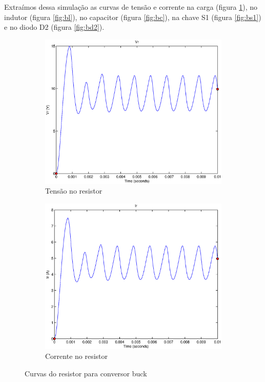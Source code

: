 \documentclass{article}
\begin{document}
Extraímos dessa simulação as curvas de tensão e corrente na carga (figura \ref{fig:br}), no indutor (figura \ref{fig:bl}), no capacitor (figura \ref{fig:bc}), na chave S1 (figura \ref{fig:bs1}) e no diodo D2 (figura \ref{fig:bd2}).
\begin{figure}[H]
	\centering
	\begin{subfigure}[b]{0.4\linewidth}
		\includegraphics[width=\linewidth]{matlab/buck/b_vr}
		\caption{Tensão no resistor}
	\end{subfigure}
	\begin{subfigure}[b]{0.4\linewidth}
		\centering
		\includegraphics[width=\linewidth]{matlab/buck/b_ir}
		\caption{Corrente no resistor}
	\end{subfigure}
	\caption{Curvas do resistor para conversor buck}
	\label{fig:br}
\end{figure}
\end{document}
